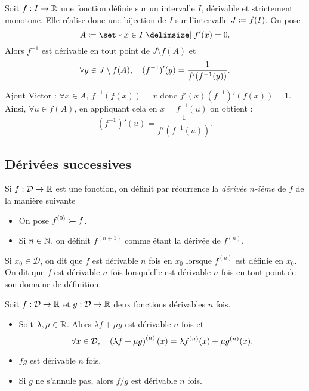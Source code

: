 \documentclass{magnolia}
\begin{document}
\begin{proposition}
Soit $f:I\to\mathbb{R}$ une fonction définie sur un intervalle $I$, dérivable et strictement monotone.
Elle réalise donc une bijection de $I$ sur l'intervalle $J\coloneqq f(I)$. On pose
\[A\defeq\enstq{x\in I}{f'(x)= 0}.\]
Alors $f^{-1}$ est dérivable en tout point de $J\setminus f(A)$ et
\[\forall y\in J\setminus f(A),\quad (f^{-1})'(y)=\frac{1}{f'(f^{-1}(y))}.\]
\end{proposition}
\begin{sol}
Ajout Victor : $\forall x \in A$, $f^{-1}(f(x))=x$ donc $f'(x)(f^{-1})'(f(x))=1$. Ainsi, $\forall u \in f(A)$, en appliquant cela en $x=f^{-1}(u)$ on obtient :
\[(f^{-1})'(u)=\frac{1}{f'(f^{-1}(u))}.\]
\end{sol}

\subsection{Dérivées successives}


\begin{definition}[utile=-3]
Si $f:\mathcal{D}\to\mathbb{R}$ est une fonction, on définit par récurrence
la \emph{dérivée $n$-ième} de $f$ de la manière suivante
\begin{itemize}
\item On pose $f^{(0)}\coloneqq f$.
\item Si $n\in\mathbb{N}$, on définit $f^{(n+1)}$ comme étant la dérivée de $f^{(n)}$.
\end{itemize}
Si $x_0\in\mathcal{D}$, on dit que $f$ est dérivable $n$ fois en $x_0$
lorsque $f^{(n)}$ est définie en $x_0$. On dit que $f$ est dérivable $n$ fois lorsqu'elle
est dérivable $n$ fois en tout point de son domaine de définition.
\end{definition}
 
\begin{proposition}[utile=-3]
Soit $f:\mathcal{D}\to\mathbb{R}$ et $g:\mathcal{D}\to\mathbb{R}$ deux fonctions dérivables $n$ fois.
\begin{itemize}
\item Soit $\lambda,\mu\in\mathbb{R}$. Alors $\lambda f+\mu g$ est dérivable $n$
  fois et
  \[\forall x\in\mathcal{D} ,\quad
    \left(\lambda f+\mu g\right)^{(n)}(x)=\lambda f^{(n)}(x)+\mu g^{(n)}(x).\]
\item $fg$ est dérivable $n$ fois.
\item Si $g$ ne s'annule pas, alors $f/g$ est dérivable $n$ fois.
\end{itemize}
\end{proposition}
\end{document}
